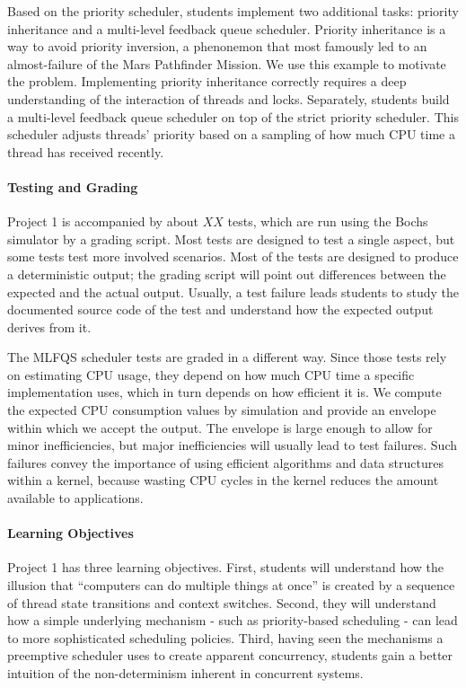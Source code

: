 Based on the priority scheduler, students implement two additional tasks: priority 
inheritance and a multi-level feedback queue scheduler.  Priority inheritance is a way
to avoid priority inversion, a phenonemon that most famously led to an almost-failure
of the Mars Pathfinder Mission.  We use this example to motivate
the problem.  Implementing priority inheritance correctly requires a deep understanding of the 
interaction of threads and locks.
Separately, students build a multi-level feedback queue scheduler on top of the strict
priority scheduler.  This scheduler adjusts threads' priority based on a sampling  of how
much CPU time a thread has received recently.

\paragraph{Testing and Grading}
Project 1 is accompanied by about $XX$ tests, which are run using the Bochs simulator by
a grading script.  Most tests are designed to test a single aspect, but some tests 
test more involved scenarios.  Most of the tests are designed to produce a deterministic 
output; the grading script will point out differences between the expected and the actual output. 
Usually, a test failure leads students to study the documented source code of the test
and understand how the expected output derives from it.

The MLFQS scheduler tests are graded in a different way. Since those tests rely on estimating CPU
usage, they depend on how much CPU time a specific implementation uses, which in turn depends on how
efficient it is.  We compute the expected CPU consumption values by simulation and provide an
envelope within which we accept the output.  The envelope is large enough to allow for minor
inefficiencies, but major inefficiencies will usually lead to test failures.  Such failures
convey the importance of using efficient algorithms and data structures within a kernel,
because wasting CPU cycles in the kernel reduces the amount available to applications.

\paragraph{Learning Objectives}
Project 1 has three learning objectives.  First, students will understand how
the illusion that ``computers can do multiple things at once'' is created by a sequence
of thread state transitions and context switches.  Second, they will understand how
a simple underlying mechanism - such as priority-based scheduling - can lead to more
sophisticated scheduling policies.  Third, having seen the mechanisms a preemptive scheduler
uses to create apparent concurrency, students gain a better intuition of the non-determinism
inherent in concurrent systems. 

